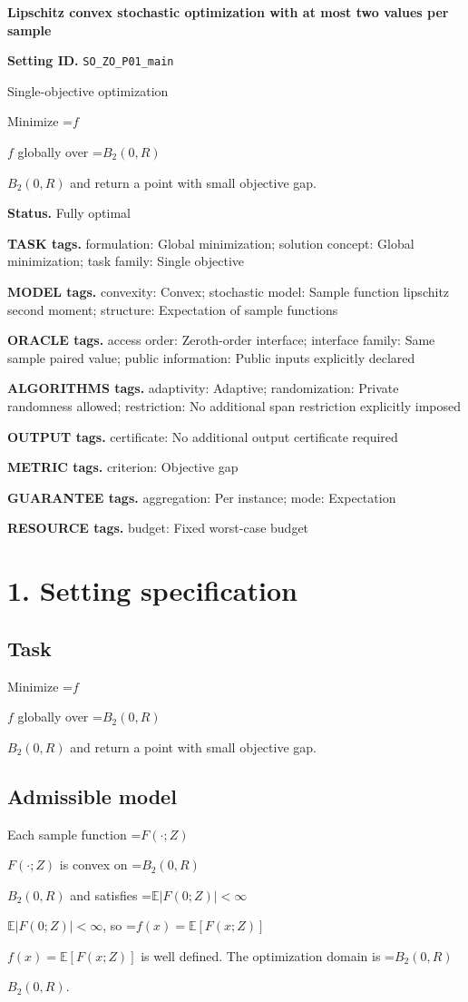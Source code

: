 \documentclass[10pt,a4paper]{article}
\newcommand{\AtlasMath}[1]{\par\begingroup\centering\setbox0=\hbox{$\displaystyle #1$}\ifdim\wd0>1.4\linewidth\typeout{ATLAS WIDE FORMULA: \the\wd0}\fi\ifdim\wd0>\linewidth\resizebox{\linewidth}{!}{\box0}\else\box0\fi\par\endgroup}
\newcommand{\AtlasInlineMath}[1]{\begingroup\setbox0=\hbox{$#1$}\ifdim\wd0>.4\linewidth\endgroup\AtlasMath{#1}\else\endgroup$#1$\fi}
\begin{document}
\raggedright

{\LARGE\bfseries\sffamily\color{AtlasNavy} Lipschitz convex stochastic optimization with at most two values per sample\par}\vspace{5pt}
\textbf{Setting ID.} \texttt{SO\_\allowbreak{}ZO\_\allowbreak{}P01\_\allowbreak{}main}

Single-objective optimization

Minimize \AtlasInlineMath{f} globally over \AtlasInlineMath{B_2(0,R)} and return a point with small objective gap.

\textbf{Status.} Fully optimal

\textbf{TASK tags.} formulation: Global minimization; solution concept: Global minimization; task family: Single objective

\textbf{MODEL tags.} convexity: Convex; stochastic model: Sample function lipschitz second moment; structure: Expectation of sample functions

\textbf{ORACLE tags.} access order: Zeroth-order interface; interface family: Same sample paired value; public information: Public inputs explicitly declared

\textbf{ALGORITHMS tags.} adaptivity: Adaptive; randomization: Private randomness allowed; restriction: No additional span restriction explicitly imposed

\textbf{OUTPUT tags.} certificate: No additional output certificate required

\textbf{METRIC tags.} criterion: Objective gap

\textbf{GUARANTEE tags.} aggregation: Per instance; mode: Expectation

\textbf{RESOURCE tags.} budget: Fixed worst-case budget

\section{1. Setting specification}
\subsection{Task}
Minimize \AtlasInlineMath{f} globally over \AtlasInlineMath{B_2(0,R)} and return a point with small objective gap.

\subsection{Admissible model}
Each sample function \AtlasInlineMath{F(\cdot;Z)} is convex on \AtlasInlineMath{B_2(0,R)} and satisfies \AtlasInlineMath{\mathbb{E}|F(0;Z)|<\infty}, so \AtlasInlineMath{f(x)=\mathbb{E}[F(x;Z)]} is well defined. The optimization domain is \AtlasInlineMath{B_2(0,R)}.
\end{document}
